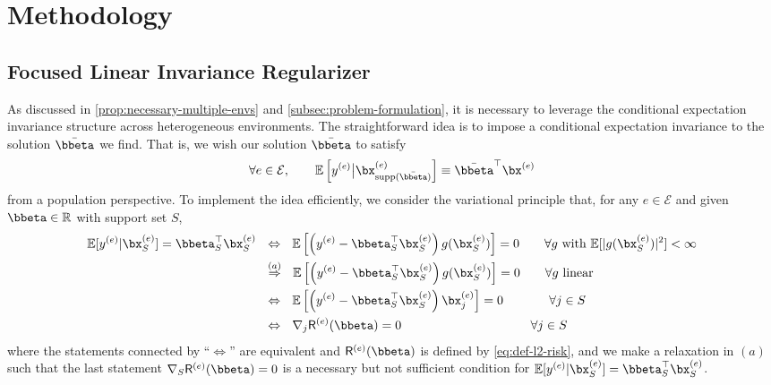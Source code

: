 \documentclass[10pt]{article}
\numberwithin{equation}{section}
\newcommand*{\supp}{\mathrm{supp}}
\begin{document}
{\section{Methodology}
\label{sec:method}

\subsection{Focused Linear Invariance Regularizer}
\label{subsec:focused-regularizer}

As discussed in \cref{prop:necessary-multiple-envs} and \cref{subsec:problem-formulation}, it is necessary to leverage the conditional expectation invariance structure across heterogeneous environments. The straightforward idea is to impose a conditional expectation invariance to the solution $\bar{\bbeta}$ we find. That is, we wish our solution $\bar{\bbeta}$ to satisfy
\begin{align*}
    \forall e\in \mathcal{E}, ~~~~~~ \mathbb{E}\left[y^{(e)} \big |\bx^{(e)}_{\supp(\bar{\bbeta})}\right] \equiv \bar{\bbeta}^\top \bx^{(e)}
\end{align*} from {a population perspective}. To implement the idea efficiently, we consider the variational principle that, for any $e\in \mathcal{E}$ and given $\bbeta \in \mathbb{R}$ with support set $S$, 
\begin{align}
     \mathbb{E}[y^{(e)}|\bx_{S}^{(e)}] = \bbeta^\top_S \bx_S^{(e)} ~~&\Leftrightarrow~~ \mathbb{E} \left[ \left(y^{(e)} - \bbeta^\top_S \bx^{(e)}_S\right) g(\bx_S^{(e)})\right] = 0  ~~~~~~ \forall g ~\text{with}~ \mathbb{E} [ |g(\bx^{(e)}_S)|^2 ] < \infty \nonumber \\
     &\overset{(a)}{\Rightarrow} ~~ \mathbb{E} \left[ \left(y^{(e)} - \bbeta^\top_S \bx^{(e)}_S\right) g(\bx_S^{(e)})\right] = 0  ~~~~~~\forall g~\mathrm{linear} \nonumber\\
     &\Leftrightarrow ~~ \mathbb{E} \left[ \left(y^{(e)} - \bbeta^\top_S \bx^{(e)}_S\right) \bx_j^{(e)}\right] = 0 ~~~~~~~~~~~ \forall j \in S \nonumber \\
     &\Leftrightarrow ~~ \nabla_j \mathsf{R}^{(e)}(\bbeta) = 0 ~~~~~~~~~~~~~~~~~~~~~~~~~~~~~~~ \forall j \in S \label{eq:fr-final-condition}
\end{align} where the statements connected by ``$\Leftrightarrow$'' are equivalent and $\mathsf{R}^{(e)}(\bbeta)$ is defined by \eqref{eq:def-l2-risk}, and we make a relaxation in $(a)$ such that the last statement $\nabla_S \mathsf{R}^{(e)}(\bbeta) = 0$ is a necessary but not sufficient condition for $\mathbb{E}[y^{(e)}|\bx_S^{(e)}] = \bbeta^\top_S\bx_S^{(e)}$. 

}
\end{document}
